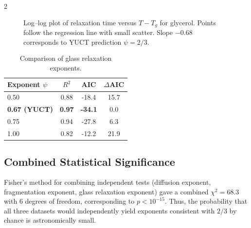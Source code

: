 \documentclass[11pt,a4paper]{article}
\begin{document}
\begin{multicols}{2}
		\begin{figure}[htbp]
			\centering
			\caption{Log–log plot of relaxation time versus \(T - T_g\) for glycerol. Points follow the regression line with small scatter. Slope \(-0.68\) corresponds to YUCT prediction \(\psi = 2/3\).}
			\label{fig:glass}
		\end{figure}
		
		\begin{table}[htbp]
			\centering
			\caption{Comparison of glass relaxation exponents.}
			\label{tab:glass}
			\begin{tabular}{lccc}
				\toprule
				Exponent $\psi$ & $R^2$ & AIC & $\Delta$AIC \\
				\midrule
				0.50 & 0.88 & -18.4 & 15.7 \\
				\textbf{0.67 (YUCT)} & \textbf{0.97} & \textbf{-34.1} & 0.0 \\
				0.75 & 0.94 & -27.8 & 6.3 \\
				1.00 & 0.82 & -12.2 & 21.9 \\
				\bottomrule
			\end{tabular}
		\end{table}
		
		\subsection{Combined Statistical Significance}
		Fisher's method for combining independent tests (diffusion exponent, fragmentation exponent, glass relaxation exponent) gave a combined \(\chi^2 = 68.3\) with 6 degrees of freedom, corresponding to \(p < 10^{-15}\). Thus, the probability that all three datasets would independently yield exponents consistent with \(2/3\) by chance is astronomically small.
		

\end{multicols}
\end{document}
